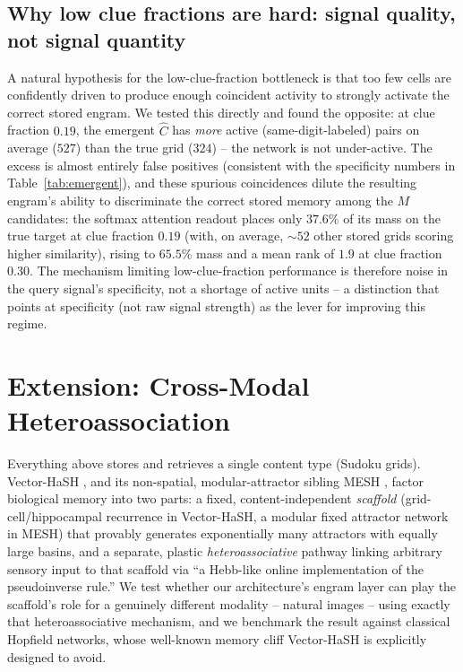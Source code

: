 \documentclass[11pt]{article}
\begin{document}
\subsection{Why low clue fractions are hard: signal quality, not signal quantity}

A natural hypothesis for the low-clue-fraction bottleneck is that too few cells are
confidently driven to produce enough coincident activity to strongly activate the correct
stored engram. We tested this directly and found the opposite: at clue fraction $0.19$, the
emergent $\hat C$ has \emph{more} active (same-digit-labeled) pairs on average ($527$) than
the true grid ($324$) -- the network is not under-active. The excess is almost entirely false
positives (consistent with the specificity numbers in Table~\ref{tab:emergent}), and these
spurious coincidences dilute the resulting engram's ability to discriminate the correct
stored memory among the $M$ candidates: the softmax attention readout places only $37.6\%$
of its mass on the true target at clue fraction $0.19$ (with, on average, ${\sim}52$ other
stored grids scoring higher similarity), rising to $65.5\%$ mass and a mean rank of $1.9$ at
clue fraction $0.30$. The mechanism limiting low-clue-fraction performance is therefore noise
in the query signal's specificity, not a shortage of active units -- a distinction that
points at specificity (not raw signal strength) as the lever for improving this regime.

\section{Extension: Cross-Modal Heteroassociation}
\label{sec:hetero}

Everything above stores and retrieves a single content type (Sudoku grids). Vector-HaSH
\cite{chandra2025}, and its non-spatial, modular-attractor sibling MESH \cite{sharma2022},
factor biological memory into two parts: a fixed, content-independent
\emph{scaffold} (grid-cell/hippocampal recurrence in Vector-HaSH, a modular fixed attractor
network in MESH) that provably generates exponentially many
attractors with equally large basins, and a separate, plastic \emph{heteroassociative} pathway
linking arbitrary sensory input to that scaffold via ``a Hebb-like online implementation of the
pseudoinverse rule.'' We test whether our architecture's engram layer can play the scaffold's
role for a genuinely different modality -- natural images -- using exactly that heteroassociative
mechanism, and we benchmark the result against classical Hopfield networks, whose well-known
memory cliff Vector-HaSH is explicitly designed to avoid.
\end{document}
